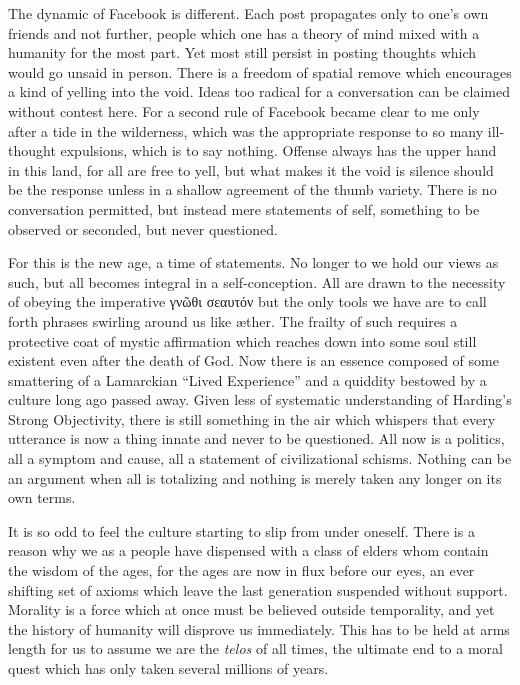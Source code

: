 \documentclass[ebook, 10pt, openright, onecolumn]{memoir}
\newcommand{\textgreek}[1]{\begingroup\fontencoding{LGR}\selectfont#1\endgroup}
\begin{document}
The dynamic of Facebook is different.  Each post propagates only to one's own
friends and not further, people which one has a theory of mind mixed with a
humanity for the most part.  Yet most still persist in posting thoughts which
would go unsaid in person.  There is a freedom of spatial remove which
encourages a kind of yelling into the void. Ideas too radical for a conversation
can be claimed without contest here.  For a second rule of Facebook became clear
to me only after a tide in the wilderness, which was the appropriate response to
so many ill-thought expulsions, which is to say nothing.  Offense always has the
upper hand in this land, for all are free to yell, but what makes it the void is
silence should be the response unless in a shallow agreement of the thumb
variety.  There is no conversation permitted, but instead mere statements of
self, something to be observed or seconded, but never questioned.

For this is the new age, a time of statements.  No longer to we hold our views
as such, but all becomes integral in a self-conception. All are drawn to the
necessity of obeying the imperative \textgreek{γνῶθι σεαυτόν} but the only tools
we have are to call forth phrases swirling around us like {\ae}ther.  The
frailty of such requires a protective coat of mystic affirmation which reaches
down into some soul still existent even after the death of God. Now there is an
essence composed of some smattering of a Lamarckian ``Lived Experience'' and a
quiddity bestowed by a culture long ago passed away.  Given less of systematic
understanding of Harding's Strong Objectivity, there is still something in the
air which whispers that every utterance is now a thing innate and never to be
questioned.  All now is a politics, all a symptom and cause, all a statement of
civilizational schisms.  Nothing can be an argument when all is totalizing and
nothing is merely taken any longer on its own terms.

It is so odd to feel the culture starting to slip from under oneself.  There is
a reason why we as a people have dispensed with a class of elders whom contain
the wisdom of the ages, for the ages are now in flux before our eyes, an ever
shifting set of axioms which leave the last generation suspended without
support.  Morality is a force which at once must be believed outside
temporality, and yet the history of humanity will disprove us immediately.  This
has to be held at arms length for us to assume we are the \textit{telos} of all
times, the ultimate end to a moral quest which has only taken several millions
of years.
\end{document}
